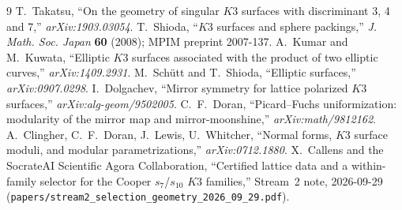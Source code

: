 \documentclass[11pt,a4paper]{article}
\theoremstyle{remark}
\begin{document}
\begin{thebibliography}{9}
 T.~Takatsu, ``On the geometry of singular $K3$ surfaces with discriminant 3, 4 and 7,''
  \textit{arXiv:1903.03054}.
 T.~Shioda, ``$K3$ surfaces and sphere packings,'' \textit{J. Math. Soc. Japan} \textbf{60}
  (2008); MPIM preprint 2007-137.
 A.~Kumar and M.~Kuwata, ``Elliptic $K3$ surfaces associated with the product of two elliptic
  curves,'' \textit{arXiv:1409.2931}.
 M.~Sch\"utt and T.~Shioda, ``Elliptic surfaces,'' \textit{arXiv:0907.0298}.
 I.~Dolgachev, ``Mirror symmetry for lattice polarized $K3$ surfaces,''
  \textit{arXiv:alg-geom/9502005}.
 C.~F.~Doran, ``Picard--Fuchs uniformization: modularity of the mirror map and
  mirror-moonshine,'' \textit{arXiv:math/9812162}.
 A.~Clingher, C.~F.~Doran, J.~Lewis, U.~Whitcher, ``Normal forms, $K3$ surface moduli, and
  modular parametrizations,'' \textit{arXiv:0712.1880}.
 X.~Callens and the SocrateAI Scientific Agora Collaboration, ``Certified lattice data and a
  within-family selector for the Cooper $s_7$/$s_{10}$ $K3$ families,'' Stream~2 note, 2026-09-29
  (\texttt{papers/stream2\_selection\_geometry\_2026\_09\_29.pdf}).
\end{thebibliography}
\end{document}
